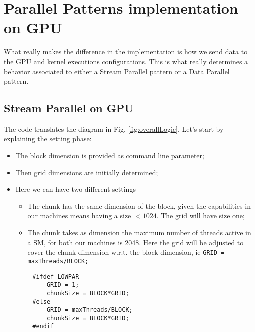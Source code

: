 \section{Parallel Patterns implementation on GPU}
What really makes the difference in the implementation is how we send data to the GPU and kernel executions configurations.
This is what really determines a behavior associated to either a Stream Parallel pattern or a Data Parallel pattern.


\subsection{Stream Parallel on GPU}
	The code translates the diagram in Fig. \ref{fig:overallLogic}.
	Let's start by explaining the setting phase:
	\begin{itemize}
		\item The block dimension is provided as command line parameter;
		\item Then grid dimensions are initially determined;
		\item Here we can have two different settings
		\begin{itemize}
			\item The chunk has the same dimension of the block, given the capabilities in our machines means having a size \(< 1024\). The grid will have size one;
			\item The chunk takes as dimension the maximum number of threads active in a SM, for both our machines is 2048. Here the grid will be adjusted to cover the chunk dimension w.r.t. the block dimension, ie \texttt{GRID = maxThreads/BLOCK;}
		\end{itemize}
	
	\end{itemize}
		\begin{lstlisting}		
		#ifdef LOWPAR
			GRID = 1;
			chunkSize = BLOCK*GRID;		
		#else
			GRID = maxThreads/BLOCK;  
			chunkSize = BLOCK*GRID;		
		#endif		
		\end{lstlisting}
	
